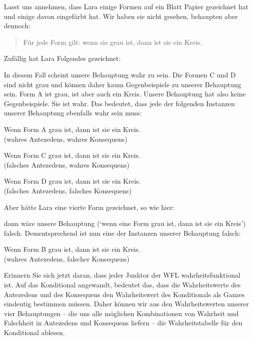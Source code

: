 Lasst uns annehmen, dass Lara einige Formen auf ein Blatt Papier gezeichnet hat und einige davon eingefärbt hat. Wir haben sie nicht gesehen, behaupten aber dennoch:
	\begin{quote}
		Für jede Form gilt: wenn sie grau ist, dann ist sie ein Kreis.
	\end{quote}
Zufällig hat Lara Folgendes gezeichnet:
\begin{center}
\end{center}
In diesem Fall scheint unsere Behauptung wahr zu sein. Die Formen C und D sind nicht grau und können daher kaum Gegenbeispiele zu unserer Behauptung sein. Form A ist grau, ist aber auch ein Kreis. Unsere Behauptung hat also keine Gegenbeispiele. Sie ist wahr. Das bedeutet, dass jede der folgenden Instanzen unserer Behauptung ebenfalls wahr sein muss:
	\begin{ebullet}
		\item Wenn Form A grau ist, dann ist sie ein Kreis. \\ (wahres Antezedens, wahres Konsequens)
		\item Wenn Form C grau ist, dann ist sie ein Kreis. \\ (falsches Antezedens, wahres Konsequens)
		\item Wenn Form D grau ist, dann ist sie ein Kreis. \\ (falsches Antezedens, falsches Konsequens)
	\end{ebullet}
Aber hätte Lara eine vierte Form gezeichnet, so wie hier:
\begin{center}
\end{center}
dann wäre unsere Behauptung (`wenn eine Form grau ist, dann ist sie ein Kreis') falsch. Dementsprechend ist nun eine der Instanzen unserer Behauptung falsch:
	\begin{ebullet}
		\item Wenn Form B grau ist, dann ist sie ein Kreis. \\ (wahres Antezedens, falscher Konsequens)
	\end{ebullet}
Erinnern Sie sich jetzt daran, dass jeder Junktor der WFL wahrheitsfunktional ist. Auf das Konditional angewandt, bedeutet das, dass die Wahrheitswerte des Antezedens und des Konsequens den Wahrheitswert des Konditionals als Ganzes eindeutig bestimmen müssen. Daher können wir aus den Wahrheitswerten unserer vier Behauptungen -- die uns alle möglichen Kombinationen von Wahrheit und Falschheit in Antezedens und Konsequens liefern -- die Wahrheitstabelle für den Konditional ablesen.

